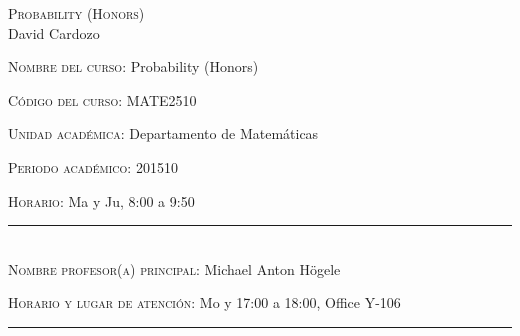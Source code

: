\begin{center}
\textsc{\large Probability (Honors) }\\[0.1cm]
\large David Cardozo\\[0.5cm]
\end{center}	

\large \noindent\textsc{Nombre del curso:}  Probability (Honors)%

\noindent\textsc{Código del curso:} MATE2510 %

\noindent\textsc{Unidad académica:} Departamento de Matemáticas

\noindent\textsc{Periodo acad\'emico:} 201510 %

\noindent\textsc{Horario:} Ma y Ju, 8:00 a 9:50%

\noindent\rule{\textwidth}{1pt}\\[-0.3cm]

\normalsize \noindent\textsc{Nombre profesor(a) principal:}  Michael Anton Högele%


\noindent\textsc{Horario y lugar de atenci\'on:} Mo y  17:00 a
18:00, Office Y-106

\noindent\rule{\textwidth}{1pt}\\[-0.1cm]